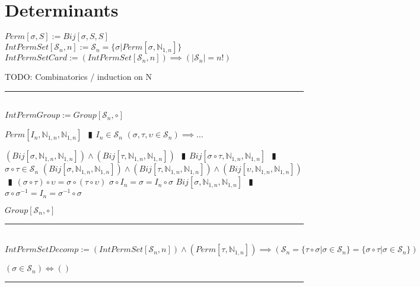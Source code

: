 \documentclass{book}
\newcommand{\abr}{:=}
\newcommand{\pipe}{$\phantom{(}\vrectangleblack\phantom{)}$}
\begin{document}
\section{Determinants}
$Perm[\sigma, S] \abr Bij[\sigma, S, S]$ \\
$IntPermSet[\mathcal{S}_n, n] \abr \mathcal{S}_n = \{\sigma | Perm[\sigma, \mathbb{N}_{1, n}]\}$ \\

$IntPermSetCard \abr (IntPermSet[\mathcal{S}_n, n]) \implies (|\mathcal{S}_n| = n!)$
\begin{enumerate}
  \lit TODO: Combinatorics / induction on N
\end{enumerate} \vspace{.75mm} \hrule \vspace{.75mm} \ \\ 

$IntPermGroup \abr Group[\mathcal{S}_n, \circ]$
\begin{enumerate}
  \lit $Perm[I_n, \mathbb{N}_{1, n}, \mathbb{N}_{1, n}]$ \pipe $I_n \in \mathcal{S}_n$
  \lit $(\sigma, \tau, \upsilon \in \mathcal{S}_n) \implies \ldots$
  \begin{enumerate}
    \lit $(Bij[\sigma, \mathbb{N}_{1, n}, \mathbb{N}_{1, n}]) \land (Bij[\tau, \mathbb{N}_{1, n}, \mathbb{N}_{1, n}])$ \pipe $Bij[\sigma \circ \tau, \mathbb{N}_{1, n}, \mathbb{N}_{1, n}]$ \pipe $\sigma \circ \tau \in \mathcal{S}_n$
    \lit $(Bij[\sigma, \mathbb{N}_{1, n}, \mathbb{N}_{1, n}]) \land (Bij[\tau, \mathbb{N}_{1, n}, \mathbb{N}_{1, n}]) \land (Bij[\upsilon, \mathbb{N}_{1, n}, \mathbb{N}_{1, n}])$ \pipe $(\sigma \circ \tau) \circ \upsilon = \sigma \circ (\tau \circ \upsilon)$
    \lit $\sigma \circ I_n = \sigma = I_n \circ \sigma$
    \lit $Bij[\sigma, \mathbb{N}_{1, n}, \mathbb{N}_{1, n}]$ \pipe $\sigma \circ \sigma^{-1} = I_n = \sigma^{-1} \circ \sigma$
  \end{enumerate}
  \lit $Group[\mathcal{S}_n, \circ]$
\end{enumerate} \vspace{.75mm} \hrule \vspace{.75mm} \ \\ 



$IntPermSetDecomp \abr (IntPermSet[\mathcal{S}_n, n]) \land (Perm[\tau, \mathbb{N}_{1, n}]) \implies (\mathcal{S}_n = \{\tau \circ \sigma | \sigma \in \mathcal{S}_n\} = \{\sigma \circ \tau | \sigma \in \mathcal{S}_n\})$
\begin{enumerate}
  \lit $(\sigma \in \mathcal{S}_n) \iff ()$
\end{enumerate} \vspace{.75mm} \hrule \vspace{.75mm} \ \\ 
\end{document}
